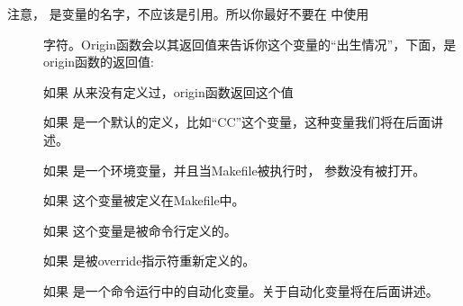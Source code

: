 \documentclass[a4paper,10pt]{sphinxmanual}
\begin{document}
\begin{sphinxVerbatim}[commandchars=\\\{\}]
 \PYGZlt{}\PYGZgt{}
\end{sphinxVerbatim}
\begin{description}
\item[{注意，  是变量的名字，不应该是引用。所以你最好不要在  中使用}] \leavevmode
\sphinxcode{\sphinxupquote{\$}} 字符。Origin函数会以其返回值来告诉你这个变量的“出生情况”，下面，是origin函数的返回值:

\item[{}] \leavevmode
如果  从来没有定义过，origin函数返回这个值 

\item[{}] \leavevmode
如果  是一个默认的定义，比如“CC”这个变量，这种变量我们将在后面讲述。

\item[{}] \leavevmode
如果  是一个环境变量，并且当Makefile被执行时，  参数没有被打开。

\item[{}] \leavevmode
如果  这个变量被定义在Makefile中。

\item[{}] \leavevmode
如果  这个变量是被命令行定义的。

\item[{}] \leavevmode
如果  是被override指示符重新定义的。

\item[{}] \leavevmode
如果  是一个命令运行中的自动化变量。关于自动化变量将在后面讲述。

\end{description}
\end{document}

